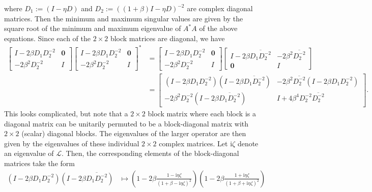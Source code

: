 \documentclass[a4paper,10pt]{article}
\begin{document}
%
where $D_1 := (I - \eta D)$ and $D_2 := ((1+\beta)I - \eta D)^{-2}$ are
complex diagonal matrices. Then the minimum and maximum singular values are
given by the square root of the minimum and maximum eigenvalue of $A^*A$
of the above equations. Since each of the $2\times 2$ block matrices are
diagonal, we have
%
\begin{align*}
\begin{bmatrix} I - 2\beta D_1D_2^{-2} & \mathbf{0} \\ -2\beta^2D_2^{-2} & I \end{bmatrix}
	\begin{bmatrix} I - 2\beta D_1D_2^{-2} & \mathbf{0} \\ -2\beta^2D_2^{-2} & I \end{bmatrix}^*
& = \begin{bmatrix} I - 2\beta D_1D_2^{-2} & \mathbf{0} \\ -2\beta^2D_2^{-2} & I \end{bmatrix}
	\begin{bmatrix} I - 2\beta \overline{D_1D_2^{-2}} & -2\beta^2\overline{D_2^{-2}}\\ \mathbf{0} & I \end{bmatrix} \\
& = \begin{bmatrix}  (I - 2\beta D_1D_2^{-2})( I - 2\beta\overline{D_1D_2^{-2}}) & -2\beta^2\overline{D_2^{-2}}
	(I - 2\beta D_1D_2^{-2}) \\ -2\beta^2D_2^{-2}( I - 2\beta \overline{D_1D_2^{-2}}) &
		I + 4\beta^4 D_2^{-2}\overline{D_2^{-2}} \end{bmatrix}.
\end{align*}
%
This looks complicated, but note that a $2\times 2$ block matrix where each
block is a diagonal matrix can be unitarily permuted to be a block-diagonal
matrix with $2\times 2$ (scalar) diagonal blocks. The eigenvalues of the
larger operator are then given by the eigenvalues of these individual $2\times 2$
complex matrices. Let $\mathrm{i}\zeta$ denote an eigenvalue of $\mathcal{L}$. Then,
the corresponding elements of the block-diagonal matrices take the form
%
\begin{align*}
(I - 2\beta D_1D_2^{-2})( I - 2\beta\overline{D_1D_2^{-2}}) & \mapsto 
	\left( 1 - 2\beta \frac{1 - \mathrm{i}\eta\zeta}{(1+\beta - \mathrm{i}\eta\zeta)^{2}}\right)
		\left(1 - 2\beta\frac{1 + \mathrm{i}\eta\zeta}{(1+\beta + \mathrm{i}\eta\zeta)^{2}}\right)
\end{align*}


\end{document}
